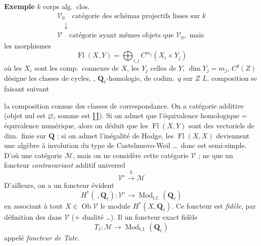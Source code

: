 \documentclass[11pt,a4paper]{article}
\begin{document}
\textbf{Exemple} $k$ corps alg.\ clos.
\[
\begin{array}{l}
  \mathcal{V}_{0} \quad \text{catégorie des schémas projectifs lisses sur } k \\
  \quad\downarrow \\
  \mathcal{V} \quad \text{catégorie ayant mêmes objets que } \mathcal{V}_{0},
  \text{ mais}
\end{array}
\]
les morphismes 
\[
  \operatorname{Fl}(X,Y) = \bigoplus_{i,j} C^{m_{j}}(X_{i} \times Y_{j})
\]
où les $X_{i}$ sont les comp.\ connexes de $X$, les $Y_{j}$ celles de $Y$,
$\dim Y_{j} = m_{j}$,  $C^{q}(Z)$ désigne les classes de cycles,
,  \ill{}
$\mathbf{Q}_{\ell}$-homologie, de codim.\ $q$ sur $Z$ \ill{} $L$.
 composition se faisant suivant

la composition connue des classes de correspondance. On a catégorie additive
(objet nul est $\varnothing$, somme est $\amalg$).
Si on admet que l'équivalence homologique = équivalence numérique, alors on
déduit  que les
$\operatorname{Fl}(X,Y)$ sont des vectoriels de dim.\ finie sur $\mathbf{Q}$ ;
si on admet l'inégalité de Hodge, les $\operatorname{Fl}(X,X)$ deviennent une
algèbre à involution du type de Castelnuovo-Weil …\ donc est semi-simple.
D'où une catégorie  $\mathcal{M}$, mais on ne considère cette
catégorie  $\mathcal{V}$ ;  ne 
que \ill{} \ill{} un foncteur \emph{contravariant} additif universel
\[
  \mathcal{V}^{\circ} \xrightarrow{\ \underline{h}\ } \mathcal{M}
\]
D'ailleurs, on a un foncteur évident
\[
  H^{*}(\ ,\mathbf{Q}_{\ell}) \colon \mathcal{V}^{\circ} \longrightarrow
  \operatorname{Mod}_{\mathrm{t.f.}}(\mathbf{Q}_{\ell})
\]
en associant à tout $X \in \operatorname{Ob}\mathcal{V}$ le module
$H^{*}(X, \mathbf{Q}_{\ell})$. Ce foncteur est \emph{fidèle}, par définition
 des  dans $\mathcal{V}$ (+ dualité …).
Il  un foncteur exact fidèle 
\[
  T_{\ell} \colon \mathcal{M} \longrightarrow
  \operatorname{Mod}_{\mathrm{t.f.}}(\mathbf{Q}_{\ell})
\]
appelé \emph{foncteur de Tate}.
\end{document}
